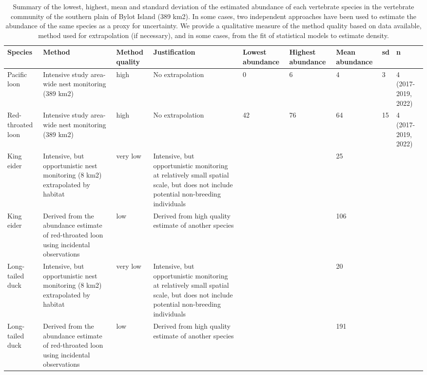\begingroup\fontsize{8pt}{10pt}\selectfont
\begin{longtable}{|p{}|p{}|p{}|p{}|p{}|p{}|p{}|p{}|p{}|}
\caption{Summary of the lowest, highest, mean and standard deviation of the estimated abundance of each vertebrate species in the vertebrate community of the southern plain of Bylot Island (389 km2). In some cases, two independent approaches have been used to estimate the abundance of the same species as a proxy for uncertainty. We provide a qualitative measure of the method quality based on data available, method used for extrapolation (if necessary), and in some cases, from the fit of statistical models to estimate density.} \\ 
  \hline
{\textbf{Species}} & {\textbf{Method}} & {\textbf{Method quality}} & {\textbf{Justification}} & {\textbf{Lowest abundance}} & {\textbf{Highest abundance}} & {\textbf{Mean abundance}} & {\textbf{sd}} & {\textbf{n}} \\ 
  \hline
Pacific loon & Intensive study area-wide nest monitoring (389 km2) & high & No extrapolation &   0 &   6 & 4 & 3 & 4 (2017-2019, 2022) \\ 
   \hline
Red-throated loon & Intensive study area-wide nest monitoring (389 km2) & high & No extrapolation &  42 &  76 & 64 & 15 & 4 (2017-2019, 2022) \\ 
   \hline
King eider & Intensive, but opportunistic nest monitoring (8 km2) extrapolated by habitat & very low & Intensive, but opportunistic monitoring at relatively small spatial scale, but does not include potential non-breeding individuals &  &  & 25 &  &  \\ 
   \hline
King eider & Derived from the abundance estimate of red-throated loon using incidental observations & low & Derived from high quality estimate of another species &  &  & 106 &  &  \\ 
   \hline
Long-tailed duck & Intensive, but opportunistic nest monitoring (8 km2) extrapolated by habitat & very low & Intensive, but opportunistic monitoring at relatively small spatial scale, but does not include potential non-breeding individuals &  &  & 20 &  &  \\ 
   \hline
Long-tailed duck & Derived from the abundance estimate of red-throated loon using incidental observations & low & Derived from high quality estimate of another species &  &  & 191 &  &  \\ 

\end{longtable}
